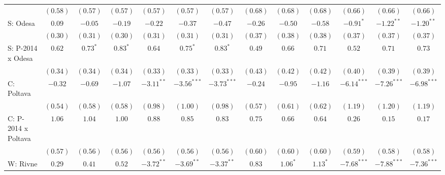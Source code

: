 \begin{table}
\begin{center}
\begin{tiny}
\begin{tabular}{l c c c c c c c c c c c c}
                            & $(0.58)$      & $(0.57)$      & $(0.57)$       & $(0.57)$      & $(0.57)$      & $(0.57)$      & $(0.68)$      & $(0.68)$       & $(0.68)$       & $(0.66)$       & $(0.66)$       & $(0.66)$       \\
S: Odesa                    & $0.09$        & $-0.05$       & $-0.19$        & $-0.22$       & $-0.37$       & $-0.47$       & $-0.26$       & $-0.50$        & $-0.58$        & $-0.91^{*}$    & $-1.22^{**}$   & $-1.20^{**}$   \\
                            & $(0.30)$      & $(0.31)$      & $(0.30)$       & $(0.31)$      & $(0.31)$      & $(0.31)$      & $(0.37)$      & $(0.38)$       & $(0.38)$       & $(0.37)$       & $(0.37)$       & $(0.37)$       \\
S: P-2014 x Odesa           & $0.62$        & $0.73^{*}$    & $0.83^{*}$     & $0.64$        & $0.75^{*}$    & $0.83^{*}$    & $0.49$        & $0.66$         & $0.71$         & $0.52$         & $0.71$         & $0.73$         \\
                            & $(0.34)$      & $(0.34)$      & $(0.34)$       & $(0.33)$      & $(0.33)$      & $(0.33)$      & $(0.43)$      & $(0.42)$       & $(0.42)$       & $(0.40)$       & $(0.39)$       & $(0.39)$       \\
C: Poltava                  & $-0.32$       & $-0.69$       & $-1.07$        & $-3.11^{**}$  & $-3.56^{***}$ & $-3.73^{***}$ & $-0.24$       & $-0.95$        & $-1.16$        & $-6.14^{***}$  & $-7.26^{***}$  & $-6.98^{***}$  \\
                            & $(0.54)$      & $(0.58)$      & $(0.58)$       & $(0.98)$      & $(1.00)$      & $(0.98)$      & $(0.57)$      & $(0.61)$       & $(0.62)$       & $(1.19)$       & $(1.20)$       & $(1.19)$       \\
C: P-2014 x Poltava         & $1.06$        & $1.04$        & $1.00$         & $0.88$        & $0.85$        & $0.83$        & $0.75$        & $0.66$         & $0.64$         & $0.26$         & $0.15$         & $0.17$         \\
                            & $(0.57)$      & $(0.56)$      & $(0.56)$       & $(0.56)$      & $(0.56)$      & $(0.56)$      & $(0.60)$      & $(0.60)$       & $(0.60)$       & $(0.59)$       & $(0.58)$       & $(0.58)$       \\
W: Rivne                    & $0.29$        & $0.41$        & $0.52$         & $-3.72^{**}$  & $-3.69^{**}$  & $-3.37^{**}$  & $0.83$        & $1.06^{*}$     & $1.13^{*}$     & $-7.68^{***}$  & $-7.88^{***}$  & $-7.36^{***}$  \\

\end{tabular}
\end{tiny}
\end{center}
\end{table}
